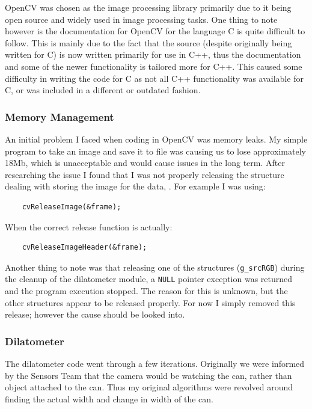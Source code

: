 OpenCV was chosen as the image processing library primarily due to it being open source and widely used in image processing tasks.  
One thing to note however is the documentation for OpenCV for the language C is quite difficult to follow.  This is mainly due to the fact that the source (despite originally being written for C) is now written primarily for use in C++, thus the documentation and some of the newer functionality is tailored more for C++.  This caused some difficulty in writing the code for C as not all C++ functionality was available for C, or was included in a different or outdated fashion. 

\subsubsection{Memory Management}

An initial problem I faced when coding in OpenCV was memory leaks.  My simple program to take an image and save it to file was causing us to lose approximately 18Mb, which is unacceptable and would cause issues in the long term.  After researching the issue I found that I was not properly releasing the structure dealing with storing the image for the data, .  For example I was using:
\begin{lstlisting}
	cvReleaseImage(&frame);
\end{lstlisting}
When the correct release function is actually:
\begin{lstlisting}
	cvReleaseImageHeader(&frame);
\end{lstlisting}

Another thing to note was that releasing one of the  structures (\verb/g_srcRGB/) during the cleanup of the dilatometer module, a \verb/NULL/ pointer exception was returned and the program execution stopped.  The reason for this is unknown, but the other  structures appear to be released properly. For now I simply removed this release; however the cause should be looked into.

\subsubsection{Dilatometer}
The dilatometer code went through a few iterations.  Originally we were informed by the Sensors Team that the camera would be watching the can, rather than object attached to the can.  Thus my original algorithms were revolved around finding the actual width and change in width of the can.

